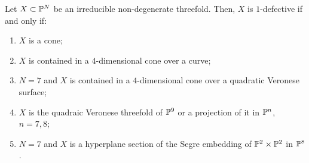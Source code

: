 \begin{theorem}
\label{geometrySecants-theorem-defective_threefolds}
    Let $X \subset \mathbb{P}^N$ be an irreducible non-degenerate threefold. Then, $X$ is $1$-defective if and only if:
    \begin{enumerate}
        \item $X$ is a cone;
        \item $X$ is contained in a $4$-dimensional cone over a curve;
        \item $N = 7$ and $X$ is contained in a $4$-dimensional cone over a quadratic Veronese surface;
        \item $X$ is the quadraic Veronese threefold of $\mathbb{P}^9$ or a projection of it in $\mathbb{P}^n$, $n = 7,8$;
        \item $N = 7$ and $X$ is a hyperplane section of the Segre embedding of $\mathbb{P}^2 \times \mathbb{P}^2$ in $\mathbb{P}^8$.
    \end{enumerate}
\end{theorem}
